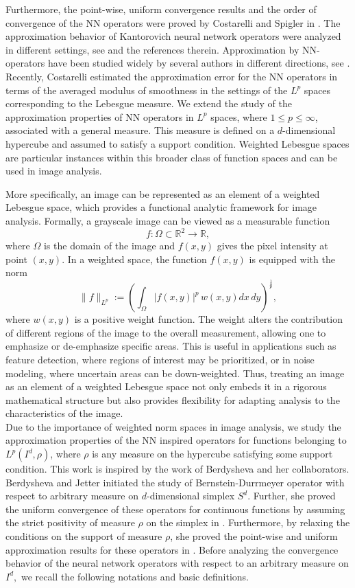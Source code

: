 \documentclass[12pt, reqno]{amsart}
\numberwithin{equation}{section}
\theoremstyle{definition}
\theoremstyle{remark}
\numberwithin{equation}{section}
\newcommand{\R}{\mathbb{R}}
\begin{document}
Furthermore, the point-wise, uniform convergence results and the order of convergence of the NN operators were proved by Costarelli and Spigler in \cite{Costar1, Costar2}. The approximation behavior of Kantorovich neural network operators were analyzed in different settings, see \cite{Cosr, Cosrv1, Cosrv2, Cosrv3} and the references therein. Approximation by NN-operators have been studied widely by several authors in different directions, see \cite{ASB, PNA, VEI, CMR, LCD, COM, HLG, CHE}. Recently, Costarelli \cite{Cost1} estimated the approximation error for the NN operators in terms of the averaged modulus of smoothness in the settings of the $L^{p}$ spaces corresponding to the Lebesgue measure. We extend the study of the approximation properties of NN operators in $L^p$ spaces, where $1\leq p\leq \infty$, associated with a general measure. This measure is defined on a $d$-dimensional hypercube and assumed to satisfy a  support condition. Weighted Lebesgue spaces are particular instances within this broader class of function spaces and can be used in image analysis. 

More specifically, an image can be represented as an element of a weighted Lebesgue space, which provides a functional analytic framework for image analysis. Formally, a grayscale image can be viewed as a measurable function 
 $$f:\Omega\subset\R^2\to \R,$$ where $\Omega$ is the domain of the image and $f(x,y)$ gives the pixel intensity at point $(x,y).$ In a weighted space, the function $f(x,y)$ is equipped with the norm
 $$\|f\|_{L^p}:=\left(\int_{\Omega}|f(x,y)|^p \,w(x,y)dx\,dy\right)^\frac{1}{p},$$ where $w(x,y)$ is a positive weight function. The weight alters the contribution of different regions of the image to the overall measurement, allowing one to emphasize or de-emphasize specific areas. This is useful in applications such as feature detection, where regions of interest may be prioritized, or in noise modeling, where uncertain areas can be down-weighted. Thus, treating an image as an element of a weighted Lebesgue space not only embeds it in a rigorous mathematical structure but also provides flexibility for adapting analysis to the characteristics of the image.\\
Due to the importance of weighted norm spaces in image analysis, we study the approximation properties of the NN inspired operators for functions belonging to $L^p(I^d,\rho)$, where $\rho$ is any measure on the hypercube satisfying some support condition. This work is inspired by the work of Berdysheva and her collaborators. Berdysheva and Jetter \cite{Elena1} initiated the study of Bernstein-Durrmeyer operator with respect to arbitrary measure on $d$-dimensional simplex $S^d.$ Further, she proved the uniform convergence of these operators for continuous functions by assuming the strict positivity of measure $\rho$ on the simplex in \cite{Elena2}. Furthermore, by relaxing the conditions on the support of measure $\rho$, she proved the point-wise and uniform approximation results for these operators in \cite{Elena3}. Before analyzing the convergence behavior of the neural network operators with respect to an arbitrary measure on $I^d,$ we recall the following notations and basic definitions. 
 
\end{document}
